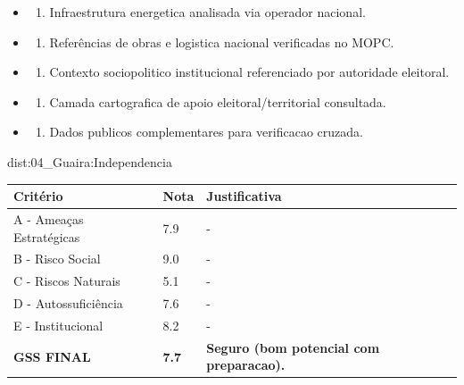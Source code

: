 {\begin{itemize}
\item
  \begin{enumerate}
  \def\labelenumi{\arabic{enumi})}
  \setcounter{enumi}{7}
  \tightlist
  \item
    Infraestrutura energetica analisada via operador nacional.
  \end{enumerate}
\item
  \begin{enumerate}
  \def\labelenumi{\arabic{enumi})}
  \setcounter{enumi}{8}
  \tightlist
  \item
    Referências de obras e logistica nacional verificadas no MOPC.
  \end{enumerate}
\item
  \begin{enumerate}
  \def\labelenumi{\arabic{enumi})}
  \setcounter{enumi}{9}
  \tightlist
  \item
    Contexto sociopolitico institucional referenciado por autoridade
    eleitoral.
  \end{enumerate}
\item
  \begin{enumerate}
  \def\labelenumi{\arabic{enumi})}
  \setcounter{enumi}{10}
  \tightlist
  \item
    Camada cartografica de apoio eleitoral/\allowbreak territorial consultada.
  \end{enumerate}
\item
  \begin{enumerate}
  \def\labelenumi{\arabic{enumi})}
  \setcounter{enumi}{11}
  \tightlist
  \item
    Dados publicos complementares para verificacao cruzada.
  \end{enumerate}
\end{itemize}}{dist:04_Guaira:Independencia}
\begin{table}[ht!]
\small \begin{tabular}{p{3.0cm}p{0.8cm}p{6.0cm}} \toprule
\textbf{Critério} & \textbf{Nota} & \textbf{Justificativa} \\ \midrule
A - Ameaças Estratégicas & 7.9 & - \\
B - Risco Social & 9.0 & - \\
C - Riscos Naturais & 5.1 & - \\
D - Autossuficiência & 7.6 & - \\
E - Institucional & 8.2 & - \\
\midrule \textbf{GSS FINAL} & \textbf{7.7} & \textbf{Seguro (bom potencial com preparacao).} \\ \bottomrule \end{tabular}
\end{table}
